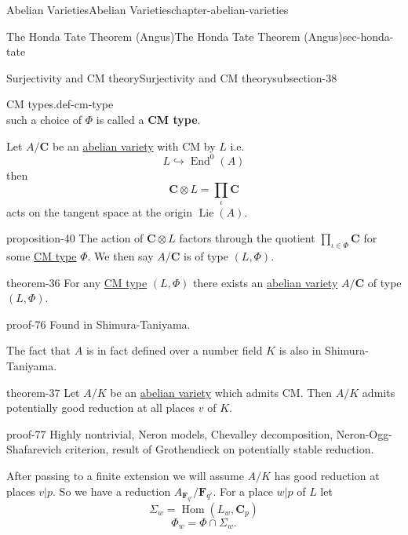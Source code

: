 \documentclass[oneside,10pt,]{book}
\newcommand{\terminology}[1]{\textbf{#1}}
\numberwithin{equation}{section}
\newcommand{\Lie}{\operatorname{Lie}}
\newcommand{\CC}{\mathbf{C}}
\newcommand{\FF}{\mathbf{F}}
\DeclareMathOperator{\End}{End}
\DeclareMathOperator{\Hom}{Hom}
\begin{document}
\begin{chapterptx}{Abelian Varieties}{}{Abelian Varieties}{}{}{chapter-abelian-varieties}
\begin{sectionptx}{The Honda Tate Theorem (Angus)}{}{The Honda Tate Theorem (Angus)}{}{}{sec-honda-tate}
\begin{subsectionptx}{Surjectivity and CM theory}{}{Surjectivity and CM theory}{}{}{subsection-38}
\begin{definition}{CM types.}{def-cm-type}
\begin{equation*}
\end{equation*}
such a choice of \(\Phi \) is called a \terminology{CM type}.%
\end{definition}
\hypertarget{p-442}{}%
Let \(A/\CC\) be an \hyperref[def-buntes-abvar]{abelian variety} with CM by \(L\) i.e.%
\begin{equation*}
L\hookrightarrow \End^0(A)
\end{equation*}
then%
\begin{equation*}
\CC\otimes L = \prod_\iota \CC
\end{equation*}
acts on the tangent space at the origin \(\Lie(A)\).%
\begin{proposition}{}{}{proposition-40}%
\hypertarget{p-443}{}%
The action of \(\CC\otimes L\) factors through the quotient \(\prod_{\iota\in \Phi} \CC\) for some \hyperref[def-cm-type]{CM type} \(\Phi\). We then say \(A/\CC\) is of type \((L,\Phi)\).%
\end{proposition}
\begin{theorem}{}{}{theorem-36}%
\hypertarget{p-444}{}%
For any \hyperref[def-cm-type]{CM type} \((L,\Phi)\) there exists an \hyperref[def-buntes-abvar]{abelian variety} \(A/\CC\) of type \((L, \Phi)\).%
\end{theorem}
\begin{proofptx}{}{proof-76}
\hypertarget{p-445}{}%
Found in Shimura-Taniyama.%
\end{proofptx}
\hypertarget{p-446}{}%
The fact that \(A\) is in fact defined over  a number field \(K\) is also in Shimura-Taniyama.%
\begin{theorem}{}{}{theorem-37}%
\hypertarget{p-447}{}%
Let \(A/K\) be an \hyperref[def-buntes-abvar]{abelian variety} which admits CM. Then \(A/K\) admits potentially good reduction at all places \(v\) of \(K\).%
\end{theorem}
\begin{proofptx}{}{proof-77}
\hypertarget{p-448}{}%
Highly nontrivial, Neron models, Chevalley decomposition, Neron-Ogg-Shafarevich criterion, result of Grothendieck on potentially stable reduction.%
\end{proofptx}
\hypertarget{p-449}{}%
After passing to a finite extension we will assume \(A/K\) has good reduction at places \(v|p\). So we have a reduction \(A_{\FF_{q'}}/\FF_{q'}\). For a place \(w|p\) of \(L\) let%
\begin{equation*}
\Sigma_w = \Hom(L_w, \CC_p)
\end{equation*}
%
\begin{equation*}
\Phi_w = \Phi \cap \Sigma_w\text{.}

\end{equation*}
\end{subsectionptx}
\end{sectionptx}
\end{chapterptx}
\end{document}
